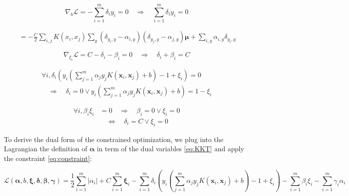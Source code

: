 \documentclass{article}
\begin{document}
\begin{equation}
    \nabla_{b} \mathcal{L}=
    -\sum_{i=1}^{m} \delta_{i} y_{i}=0
    \quad \Longrightarrow \quad \sum_{i=1}^{m} \delta_{i} y_{i}=0
\end{equation}

\begin{eqnarray}
    \ = - \frac{C}{2} \sum_{i,j} K(x_i, x_j) \sum_{y} (\delta_{y_i, y}-\alpha_{i, y}) (\delta_{y_j, y}-\alpha_{j, y}) \bm{\mu}  + \sum_{i, y} \alpha_{i, y} \delta_{y_i, y} 
\end{eqnarray}

\begin{equation}
    \nabla_{\xi_{i}} \mathcal{L}=C-\delta_{i}-\beta_{i}=0 \quad \Longrightarrow \quad \delta_{i}+\beta_{i}=C
\end{equation}

\begin{equation}
    \begin{aligned}
        \forall i, \delta_{i}
        \left(
        y_{i}\left(\sum_{j=1}^{m} \alpha_{j} y_{j} K\left(\boldsymbol{x}_{i}, \boldsymbol{x}_{j}\right)+b\right) - 1 + \xi_{i}
        \right)
        = 0 \\
        \quad \Longrightarrow \quad
        \delta_{i}=0
        \vee
        y_{i}\left(\sum_{j=1}^{m} \alpha_{j} y_{j} K\left(\boldsymbol{x}_{i}, \boldsymbol{x}_{j}\right)+b\right) = 1 - \xi_{i}
    \end{aligned}
    \label{eq:constraint}
\end{equation}


\begin{align}
    \forall i, \beta_{i} \xi_{i} & =0 \quad \Longrightarrow \quad \beta_{i}=0 \vee \xi_{i}=0 \\
                                 & \quad \Leftrightarrow \quad \delta_i = C \vee \xi_{i}=0
\end{align}

To derive the dual form of the constrained optimization, we plug into the Lagrangian the definition of $\bm{\alpha}$ in term of the dual variables \eqref{eq:KKT} and apply the constraint \eqref{eq:constraint}:



\begin{equation}
    \mathcal{L}(\bm{\alpha}, b, \bm{\xi}, \bm{\delta}, \bm{\beta}, \bm{\gamma})
    = \frac{1}{2} \sum_{i=1}^{m}\left|\alpha_{i}\right|
    + C \sum_{i=1}^{m} \bm{\xi}_{i}
    - \sum_{i=1}^{m}
    \delta_{i}
    \left(
    y_{i}\left(\sum_{j=1}^{m} \alpha_{j} y_{j} K\left(\boldsymbol{x}_{i}, \boldsymbol{x}_{j}\right)+b\right) - 1 + \xi_{i}
    \right)
    - \sum_{i=1}^{m} \beta_{i} \xi_{i}
    - \sum_{i=1}^{m} \gamma_{i} \alpha_{i}
\end{equation}
\end{document}
